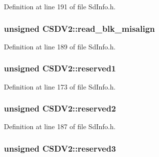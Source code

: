 Definition at line 191 of file Sd\+Info.\+h.

\subsubsection[{\texorpdfstring{read\+\_\+blk\+\_\+misalign}{read\_blk\_misalign}}]{\setlength{\rightskip}{0pt plus 5cm}unsigned C\+S\+D\+V2\+::read\+\_\+blk\+\_\+misalign}\hypertarget{struct_c_s_d_v2_aa4b5351683ccc4331a446dccfa22ba97}{}\label{struct_c_s_d_v2_aa4b5351683ccc4331a446dccfa22ba97}


Definition at line 189 of file Sd\+Info.\+h.

\subsubsection[{\texorpdfstring{reserved1}{reserved1}}]{\setlength{\rightskip}{0pt plus 5cm}unsigned C\+S\+D\+V2\+::reserved1}\hypertarget{struct_c_s_d_v2_a7778a9786d45cd4efa7bf06d7bded52a}{}\label{struct_c_s_d_v2_a7778a9786d45cd4efa7bf06d7bded52a}


Definition at line 173 of file Sd\+Info.\+h.

\subsubsection[{\texorpdfstring{reserved2}{reserved2}}]{\setlength{\rightskip}{0pt plus 5cm}unsigned C\+S\+D\+V2\+::reserved2}\hypertarget{struct_c_s_d_v2_a5151e2d94077d2a1ac8361174e4cd55a}{}\label{struct_c_s_d_v2_a5151e2d94077d2a1ac8361174e4cd55a}


Definition at line 187 of file Sd\+Info.\+h.

\subsubsection[{\texorpdfstring{reserved3}{reserved3}}]{\setlength{\rightskip}{0pt plus 5cm}unsigned C\+S\+D\+V2\+::reserved3}\hypertarget{struct_c_s_d_v2_a75924bf9bb5d5789e504a7b2d0dafb52}{}\label{struct_c_s_d_v2_a75924bf9bb5d5789e504a7b2d0dafb52}


